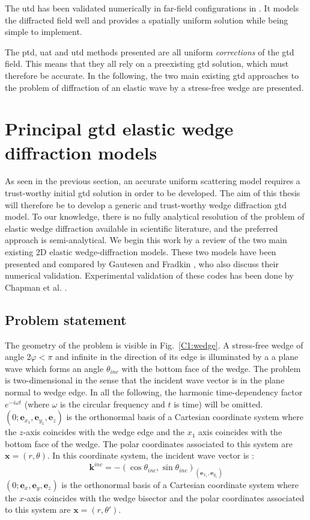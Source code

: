 The \acrfull{utd} has been validated numerically in far-field configurations in \cite{AKDthese}. It models the diffracted field well and provides a spatially uniform solution while being simple to implement.

The \acrshort{ptd}, \acrshort{uat} and \acrshort{utd} methods presented are all uniform \textit{corrections} of the \acrshort{gtd} field. This means that they all rely on a preexisting \acrshort{gtd} solution, which must therefore be accurate. In the following, the two main existing \acrshort{gtd} approaches to the problem of diffraction of an elastic wave by a stress-free wedge are presented.

\section{Principal \acrshort{gtd} elastic wedge diffraction models}

As seen in the previous section, an accurate uniform scattering model requires a trust-worthy initial \acrshort{gtd} solution in order to be developed. The aim of this thesis will therefore be to develop a generic and trust-worthy wedge diffraction \acrshort{gtd} model. To our knowledge, there is no fully analytical resolution of the problem of elastic wedge diffraction available in scientific literature, and the preferred approach is semi-analytical. We begin this work by a review of the two main existing 2D elastic wedge-diffraction models. These two models have been presented and compared by Gautesen and Fradkin \cite{GautesenFradkin}, who also discuss their numerical validation. Experimental validation  of these codes has been done by Chapman et al. \cite{ChapmanBurch}.

\subsection{Problem statement}
\label{C1:PbStatement}
The geometry of the problem is visible in Fig.~\ref{C1:wedge}. A stress-free wedge of angle $2\varphi<\pi$ and infinite in the direction of its edge is illuminated by a a plane wave which forms an angle $\theta_{inc}$ with the bottom face of the wedge. The problem is two-dimensional in the sense that the incident wave vector is in the plane normal to wedge edge. In all the following, the harmonic time-dependency factor $e^{- i\omega t}$ (where $\omega$ is the circular frequency and $t$ is time) will be omitted. $(0;\mathbf{e}_{x_1},\mathbf{e}_{y_1},\mathbf{e}_z)$ is the orthonormal basis of a Cartesian coordinate system where the $z$-axis coincides with the wedge edge and the $x_1$ axis coincides with the bottom face of the wedge. The polar coordinates associated to this system are $\mathbf{x}=(r,\theta)$. In this coordinate system, the incident wave vector is :
\begin{equation}
\mathbf{k}^{inc}=-(\cos\theta_{inc},\sin\theta_{inc})_{(\mathbf{e}_{x_1},\mathbf{e}_{y_1})}
\end{equation}
$(0;\mathbf{e}_x,\mathbf{e}_y,\mathbf{e}_z)$ is the orthonormal basis of a Cartesian coordinate system where the $x$-axis coincides with the wedge bisector and the polar coordinates associated to this system are $\mathbf{x}=(r,\theta')$.

